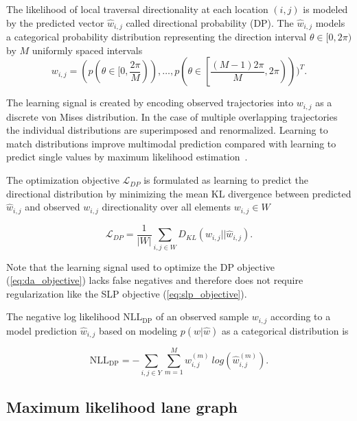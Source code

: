 \documentclass[letterpaper, 10 pt, conference]{ieeeconf}
\begin{document}
The likelihood of local traversal directionality at each location $(i,j)$ is modeled by the predicted vector $\hat{w}_{i,j}$ called directional probability (DP). The $\hat{w}_{i,j}$ models a categorical probability distribution representing the direction interval $\theta \in [0, 2 \pi)$ by $M$ uniformly spaced intervals
\begin{equation}
    w_{i,j} = (p(\theta \in [0, \frac{2\pi}{M})), \ldots , p(\theta \in \left[\frac{(M-1) 2 \pi}{M}, 2 \pi \right)) )^T.
\end{equation}

The learning signal is created by encoding observed trajectories into $w_{i,j}$ as a discrete von Mises distribution. In the case of multiple overlapping trajectories the individual distributions are superimposed and renormalized. Learning to match distributions improve multimodal prediction compared with learning to predict single values by maximum likelihood estimation~\cite{karlsson2020dsla}.

The optimization objective $\mathcal{L}_{DP}$ is formulated as learning to predict the directional distribution by minimizing the mean KL divergence between predicted $\hat{w}_{i,j}$ and observed $w_{i,j}$ directionality over all elements $w_{i,j} \in W$

\begin{equation}
    \mathcal{L}_{DP} = \frac{1}{|W|} \sum_{i,j \in W} D_{KL}(w_{i,j} || \hat{w}_{i,j}).
\label{eq:da_objective}
\end{equation}

Note that the learning signal used to optimize the DP objective (\ref{eq:da_objective}) lacks false negatives and therefore does not require regularization like the SLP objective (\ref{eq:slp_objective}).

The negative log likelihood $\text{NLL}_{\text{DP}}$ of an observed sample $w_{i,j}$ according to a model prediction $\hat{w}_{i,j}$ based on modeling $p(w|\hat{w})$ as a categorical distribution is 

\begin{equation}
    \text{NLL}_{\text{DP}} = - \sum_{i,j \in Y} \sum_{m=1}^M w^{(m)}_{i,j} \: log ( \hat{w}^{(m)}_{i,j} ).
\label{eq:nll_dp}
\end{equation}



\subsection{Maximum likelihood lane graph}
\label{seq:maximum_likelihood_path_graph}
\end{document}
